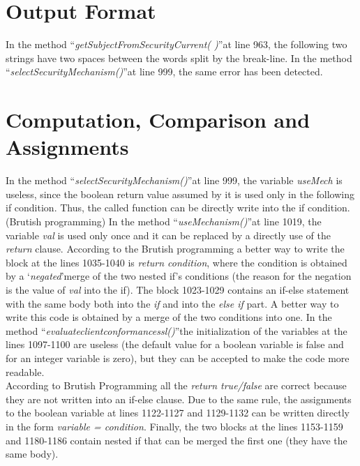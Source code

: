 \documentclass[\mainpath/main]{subfiles}
\begin{document}
\section{Output Format}
\label{CodeInspectionChecklist:OutputFormat}
In the method \textquotedblleft \textit{getSubjectFromSecurityCurrent( )}\textquotedblright at line 963, the following two strings have two spaces between the words split by the break-line.
In the method \textquotedblleft \textit{selectSecurityMechanism(\textellipsis)}\textquotedblright at line 999, the same error has been detected.

\section{Computation, Comparison and Assignments}
\label{CodeInspectionChecklist:ComputationComparisonandAssignments}
In the method \textquotedblleft \textit{selectSecurityMechanism(\textellipsis)}\textquotedblright at line 999, the variable \textit{useMech} is useless, since the boolean return value assumed by it is used only in the following if condition. Thus, the called function can be directly write into the if condition. (Brutish programming)
In the method \textquotedblleft \textit{useMechanism(\textellipsis)}\textquotedblright at line 1019, the variable \textit{val} is used only once and it can be replaced by a directly use of the \textit{return} clause. According to the Brutish programming a better way to write the block at the lines 1035-1040 is \textit{return condition}, where the condition is obtained by a \textquoteleft \textit{negated}\textquoteright merge of the two nested if's conditions (the reason for the negation is the value of \textit{val} into the if).
The block 1023-1029 contains an if-else statement with the same body both into the \textit{if} and into the \textit{else if} part. A better way to write this code is obtained by a merge of the two conditions into one.
In the method \textquotedblleft \textit{evaluate\textunderscore client\textunderscore conformance\textunderscore ssl(\textellipsis)}\textquotedblright the initialization of the variables at the lines 1097-1100 are useless (the default value for a boolean variable is false and for an integer variable is zero), but they can be accepted to make the code more readable.\\
According to Brutish Programming all the \textit{return true/false} are correct because they are not written into an if-else clause. Due to the same rule, the assignments to the boolean variable at lines 1122-1127 and 1129-1132 can be written directly in the form \textit{variable = condition}.
Finally, the two blocks at the lines 1153-1159 and 1180-1186 contain nested if that can be merged the first one (they have the same body).
\end{document}
